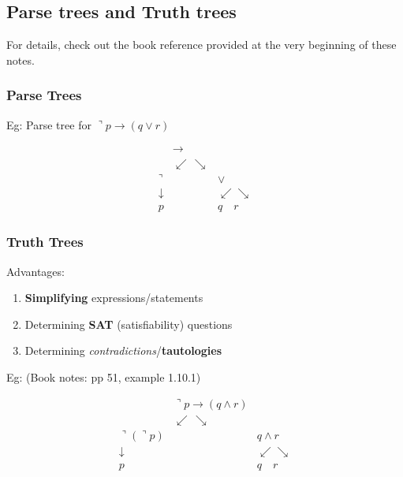 \subsection{Parse trees and Truth
trees}\label{parse-trees-and-truth-trees}

For details, check out the book reference provided at the very beginning
of these notes.

\subsubsection{Parse Trees}\label{parse-trees}

Eg: Parse tree for \(\urcorner p\rightarrow (q \vee r)\)

\begin{equation}
\begin{array}{ccc}
\phantom{p} & \rightarrow & \phantom{p}
\\
\phantom{p} & \swarrow\,\searrow  & \phantom{p}
\\
\urcorner  & \phantom{\rightarrow} & \vee 
\\
\downarrow  & \phantom{\rightarrow} & \swarrow \searrow
\\
p & \phantom{\rightarrow} &  q \quad r 
\end{array}
\end{equation}

\subsubsection{Truth Trees}\label{truth-trees}

Advantages:

\begin{enumerate}
\def\labelenumi{\arabic{enumi}.}
\tightlist
\item
  \textbf{Simplifying} expressions/statements
\item
  Determining \textbf{SAT} (satisfiability) questions
\item
  Determining \emph{contradictions}/\textbf{tautologies}
\end{enumerate}

Eg: (Book notes: pp 51, example 1.10.1)

\begin{equation}
\begin{array}{ccc}
\phantom{p} & \urcorner p \rightarrow (q\wedge r) & \phantom{p}
\\
\phantom{p} & \swarrow\,\searrow  & \phantom{p}
\\
\urcorner (\urcorner p)  & \phantom{\rightarrow} & q\wedge r 
\\
\downarrow  & \phantom{\rightarrow} & \swarrow \searrow
\\
p & \phantom{\rightarrow} &  q \quad r 
\end{array}
\end{equation}

